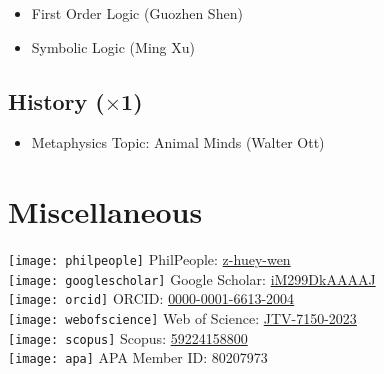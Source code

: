 \documentclass[10pt]{article}
\begin{document}
\begin{itemize}
\item First Order Logic (Guozhen Shen)
\item Symbolic Logic (Ming Xu)
\end{itemize}

\subsection*{History (\begin{math}\times\end{math}1)}

\begin{itemize}
\item Metaphysics Topic: Animal Minds (Walter Ott)
\end{itemize}

\section*{Miscellaneous}

\begin{multicols}{2}
\texttt{[image: philpeople]} \hspace*{\fill}PhilPeople: \href{https://philpeople.org/profiles/z-huey-wen}{z-huey-wen}\\
\texttt{[image: googlescholar]} \hspace*{\fill}Google Scholar: \href{https://scholar.google.com/citations?hl=en&user=iM299DkAAAAJ}{iM299DkAAAAJ}\\
\texttt{[image: orcid]} \hspace*{\fill}ORCID: \href{https://orcid.org/0000-0001-6613-2004}{0000-0001-6613-2004}\\
\texttt{[image: webofscience]} \hspace*{\fill}Web of Science: \href{https://www.webofscience.com/wos/author/record/JTV-7150-2023}{JTV-7150-2023}\\
\texttt{[image: scopus]} \hspace*{\fill}Scopus: \href{https://www.scopus.com/authid/detail.uri?authorId=59224158800}{59224158800}\\\texttt{[image: apa]} \hspace*{\fill}APA Member ID: 80207973
\end{multicols}
\end{document}

